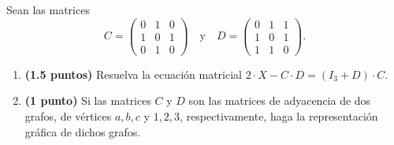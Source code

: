 
Sean las matrices
\[
C=\begin{pmatrix}0&1&0\\1&0&1\\0&1&0\end{pmatrix}\quad\text{y}\quad D=\begin{pmatrix}0&1&1\\1&0&1\\1&1&0\end{pmatrix}.
\]
\begin{enumerate}[label=\alph*)]
\item \textbf{(1.5 puntos)} Resuelva la ecuación matricial $2\cdot X-C\cdot D=(I_3+D)\cdot C$.
\item \textbf{(1 punto)} Si las matrices $C$ y $D$ son las matrices de adyacencia de dos grafos, de vértices $a,b,c$ y $1,2,3$, respectivamente, haga la representación gráfica de dichos grafos.
\end{enumerate}
